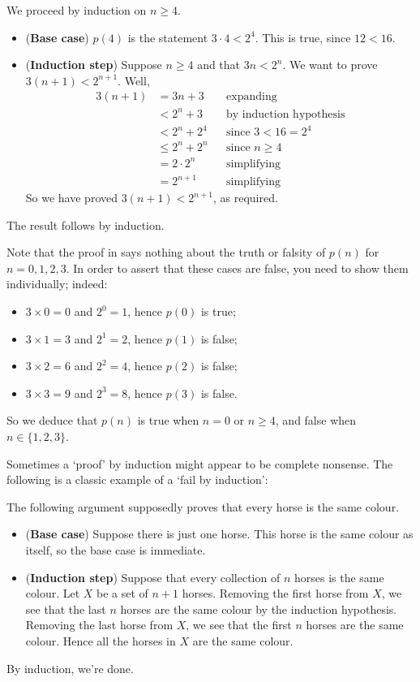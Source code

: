 \begin{cproof}
We proceed by induction on $n \ge 4$.
\begin{itemize}
\item (\textbf{Base case}) $p(4)$ is the statement $3 \cdot 4 < 2^4$. This is true, since $12 < 16$.

\item (\textbf{Induction step}) Suppose $n \ge 4$ and that $3n < 2^n$. We want to prove $3(n+1) < 2^{n+1}$. Well,
\begin{align*}
3(n+1) &= 3n+3 && \text{expanding} \\
&< 2^n + 3   && \text{by induction hypothesis} \\
&< 2^n + 2^4 && \text{since $3 < 16 = 2^4$} \\
&\le 2^n + 2^n && \text{since $n \ge 4$} \\
&= 2 \cdot 2^n && \text{simplifying} \\
&= 2^{n+1} && \text{simplifying}
\end{align*}
So we have proved $3(n+1) < 2^{n+1}$, as required.
\end{itemize}
The result follows by induction.
\end{cproof}

Note that the proof in  says nothing about the truth or falsity of $p(n)$ for $n=0,1,2,3$. In order to assert that these cases are false, you need to show them individually; indeed:
\begin{itemize}
\item $3 \times 0 = 0$ and $2^0 = 1$, hence $p(0)$ is true;
\item $3 \times 1 = 3$ and $2^1 = 2$, hence $p(1)$ is false;
\item $3 \times 2 = 6$ and $2^2 = 4$, hence $p(2)$ is false;
\item $3 \times 3 = 9$ and $2^3 = 8$, hence $p(3)$ is false.
\end{itemize}
So we deduce that $p(n)$ is true when $n=0$ or $n \ge 4$, and false when $n \in \{ 1, 2, 3 \}$.

Sometimes a `proof' by induction might appear to be complete nonsense. The following is a classic example of a `fail by induction':

\begin{example}
\label{exHorseInductionFail}
The following argument supposedly proves that every horse is the same colour.
\begin{itemize}
\item (\textbf{Base case}) Suppose there is just one horse. This horse is the same colour as itself, so the base case is immediate.
\item (\textbf{Induction step}) Suppose that every collection of $n$ horses is the same colour. Let $X$ be a set of $n+1$ horses. Removing the first horse from $X$, we see that the last $n$ horses are the same colour by the induction hypothesis. Removing the last horse from $X$, we see that the first $n$ horses are the same colour. Hence all the horses in $X$ are the same colour.
\end{itemize}
By induction, we're done.
\end{example}

